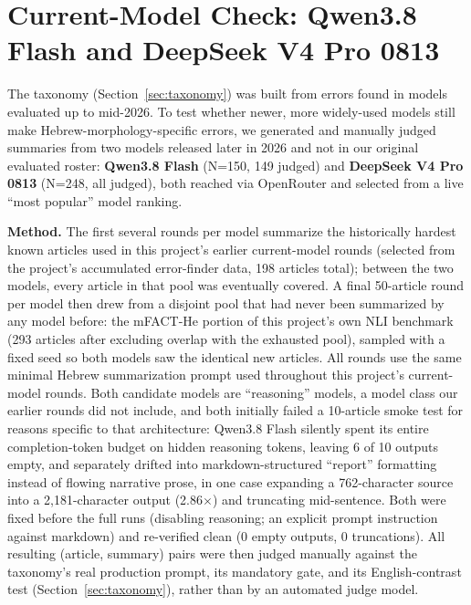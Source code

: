 \documentclass[11pt]{article}
\begin{document}
\section{Current-Model Check: Qwen3.8 Flash and DeepSeek V4 Pro 0813}
\label{app:current_model_check}
The taxonomy (Section~\ref{sec:taxonomy}) was built from errors found in models evaluated up to mid-2026. To test whether newer, more widely-used models still make Hebrew-morphology-specific errors, we generated and manually judged summaries from two models released later in 2026 and not in our original evaluated roster: \textbf{Qwen3.8 Flash} (N=150, 149 judged) and \textbf{DeepSeek V4 Pro 0813} (N=248, all judged), both reached via OpenRouter and selected from a live ``most popular'' model ranking.

\textbf{Method.} The first several rounds per model summarize the historically hardest known articles used in this project's earlier current-model rounds (selected from the project's accumulated error-finder data, 198 articles total); between the two models, every article in that pool was eventually covered. A final 50-article round per model then drew from a disjoint pool that had never been summarized by any model before: the mFACT-He portion of this project's own NLI benchmark (293 articles after excluding overlap with the exhausted pool), sampled with a fixed seed so both models saw the identical new articles. All rounds use the same minimal Hebrew summarization prompt used throughout this project's current-model rounds. Both candidate models are ``reasoning'' models, a model class our earlier rounds did not include, and both initially failed a 10-article smoke test for reasons specific to that architecture: Qwen3.8 Flash silently spent its entire completion-token budget on hidden reasoning tokens, leaving 6 of 10 outputs empty, and separately drifted into markdown-structured ``report'' formatting instead of flowing narrative prose, in one case expanding a 762-character source into a 2,181-character output (2.86$\times$) and truncating mid-sentence. Both were fixed before the full runs (disabling reasoning; an explicit prompt instruction against markdown) and re-verified clean (0 empty outputs, 0 truncations). All resulting (article, summary) pairs were then judged manually against the taxonomy's real production prompt, its mandatory gate, and its English-contrast test (Section~\ref{sec:taxonomy}), rather than by an automated judge model.
\end{document}
